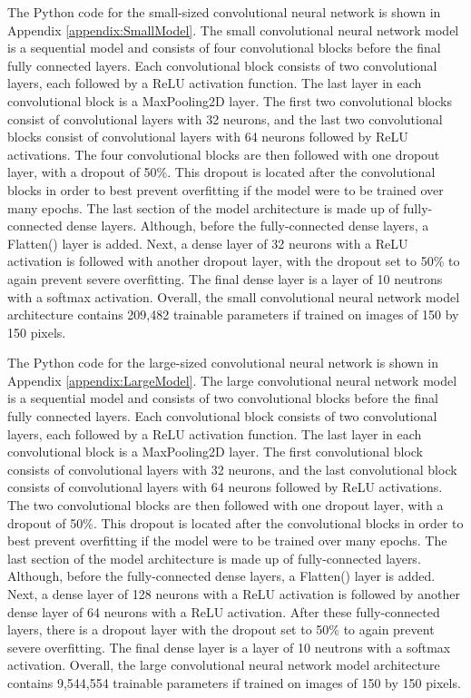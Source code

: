 \documentclass{l4proj}
\begin{document}
The Python code for the small-sized convolutional neural network is shown in Appendix \ref{appendix:SmallModel}.
The small convolutional neural network model is a sequential model and consists of four convolutional blocks before the final fully connected layers.
Each convolutional block consists of two convolutional layers, each followed by a ReLU activation function.
The last layer in each convolutional block is a MaxPooling2D layer.
The first two convolutional blocks consist of convolutional layers with 32 neurons, and the last two convolutional blocks consist of convolutional layers with 64 neurons followed by ReLU activations.
The four convolutional blocks are then followed with one dropout layer, with a dropout of 50\%. This dropout is located after the convolutional blocks in order to best prevent overfitting if the model were to be trained over many epochs.
The last section of the model architecture is made up of fully-connected dense layers.
Although, before the fully-connected dense layers, a Flatten() layer is added.
Next, a dense layer of 32 neurons with a ReLU activation is followed with another dropout layer, with the dropout set to 50\% to again prevent severe overfitting.
The final dense layer is a layer of 10 neutrons with a softmax activation.
Overall, the small convolutional neural network model architecture contains 209,482 trainable parameters if trained on images of 150 by 150 pixels.


The Python code for the large-sized convolutional neural network is shown in Appendix \ref{appendix:LargeModel}.
The large convolutional neural network model is a sequential model and consists of two convolutional blocks before the final fully connected layers.
Each convolutional block consists of two convolutional layers, each followed by a ReLU activation function.
The last layer in each convolutional block is a MaxPooling2D layer.
The first convolutional block consists of convolutional layers with 32 neurons, and the last convolutional block consists of convolutional layers with 64 neurons followed by ReLU activations.
The two convolutional blocks are then followed with one dropout layer, with a dropout of 50\%. This dropout is located after the convolutional blocks in order to best prevent overfitting if the model were to be trained over many epochs.
The last section of the model architecture is made up of fully-connected layers.
Although, before the fully-connected dense layers, a Flatten() layer is added.
Next, a dense layer of 128 neurons with a ReLU activation is followed by another dense layer of 64 neurons with a ReLU activation. After these fully-connected layers, there is a dropout layer with the dropout set to 50\% to again prevent severe overfitting.
The final dense layer is a layer of 10 neutrons with a softmax activation.
Overall, the large convolutional neural network model architecture contains 9,544,554 trainable parameters if trained on images of 150 by 150 pixels.
\end{document}
